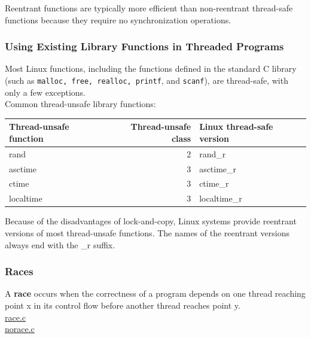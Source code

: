 \documentclass[11pt]{article}
\begin{document}
Reentrant functions are typically more efficient than non-reentrant thread-safe functions because they require no synchronization operations.\\





\subsubsection{Using Existing Library Functions in Threaded Programs}
\label{sec:org1aba22a}

Most Linux functions, including the functions defined in the standard C library (such as \texttt{malloc, free, realloc, printf}, and \texttt{scanf}), are thread-safe, with only a few exceptions.\\

Common thread-unsafe library functions:\\
\begin{center}
\begin{tabular}{lrl}
Thread-unsafe function & Thread-unsafe class & Linux thread-safe version\\
\hline
rand & 2 & rand\_r\\
asctime & 3 & asctime\_r\\
ctime & 3 & ctime\_r\\
localtime & 3 & localtime\_r\\
\end{tabular}
\end{center}



Because of the disadvantages of lock-and-copy, Linux systems provide reentrant versions of most thread-unsafe functions. The names of the reentrant versions always end with the \_r suffix.\\



\subsubsection{Races}
\label{sec:org220c7c6}
A \textbf{race} occurs when the correctness of a program depends on one thread reaching point x in its control flow before another thread reaches point y.\\


\href{code/c12-concurrent-programming/race.c}{race.c}\\
\href{code/c12-concurrent-programming/norace.c}{norace.c}\\
\end{document}
